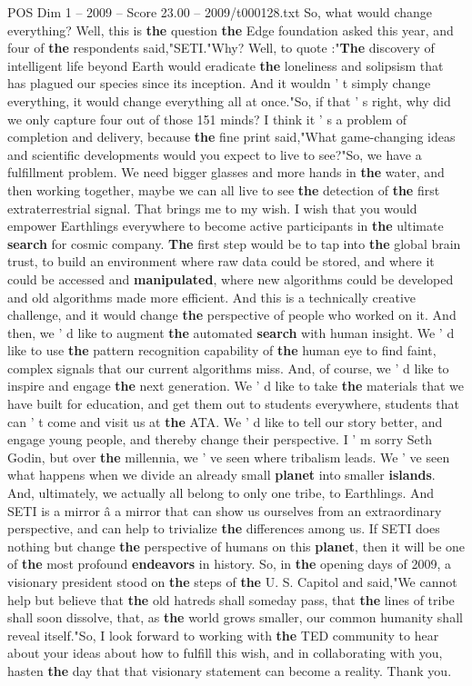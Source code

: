 \begin{textsample}{POS Dim 1 – 2009 – Score 23.00 – 2009/t000128.txt}
So, what would change everything?
Well, this is \textbf{the} question \textbf{the} Edge foundation asked this year, and four of \textbf{the} respondents said,"SETI."Why?
Well, to quote :"\textbf{The} discovery of intelligent life beyond Earth would eradicate \textbf{the} loneliness and solipsism that has plagued our species since its inception.
And it wouldn ' t simply change everything, it would change everything all at once."So, if that ' s right, why did we only capture four out of those 151 minds?
I think it ' s a problem of completion and delivery, because \textbf{the} fine print said,"What game-changing ideas and scientific developments would you expect to live to see?"So, we have a fulfillment problem.
We need bigger glasses and more hands in \textbf{the} water, and then working together, maybe we can all live to see \textbf{the} detection of \textbf{the} first extraterrestrial signal.
That brings me to my wish.
I wish that you would empower Earthlings everywhere to become active participants in \textbf{the} ultimate \textbf{search} for cosmic company. \textbf{The} first step would be to tap into \textbf{the} global brain trust, to build an environment where raw data could be stored, and where it could be accessed and \textbf{manipulated}, where new algorithms could be developed and old algorithms made more efficient.
And this is a technically creative challenge, and it would change \textbf{the} perspective of people who worked on it.
And then, we ' d like to augment \textbf{the} automated \textbf{search} with human insight.
We ' d like to use \textbf{the} pattern recognition capability of \textbf{the} human eye to find faint, complex signals that our current algorithms miss.
And, of course, we ' d like to inspire and engage \textbf{the} next generation.
We ' d like to take \textbf{the} materials that we have built for education, and get them out to students everywhere, students that can ' t come and visit us at \textbf{the} ATA.
We ' d like to tell our story better, and engage young people, and thereby change their perspective.
I ' m sorry Seth Godin, but over \textbf{the} millennia, we ' ve seen where tribalism leads.
We ' ve seen what happens when we divide an already small \textbf{planet} into smaller \textbf{islands}.
And, ultimately, we actually all belong to only one tribe, to Earthlings.
And SETI is a mirror â a mirror that can show us ourselves from an extraordinary perspective, and can help to trivialize \textbf{the} differences among us.
If SETI does nothing but change \textbf{the} perspective of humans on this \textbf{planet}, then it will be one of \textbf{the} most profound \textbf{endeavors} in history.
So, in \textbf{the} opening days of 2009, a visionary president stood on \textbf{the} steps of \textbf{the} U.
S.
Capitol and said,"We cannot help but believe that \textbf{the} old hatreds shall someday pass, that \textbf{the} lines of tribe shall soon dissolve, that, as \textbf{the} world grows smaller, our common humanity shall reveal itself."So, I look forward to working with \textbf{the} TED community to hear about your ideas about how to fulfill this wish, and in collaborating with you, hasten \textbf{the} day that that visionary statement can become a reality.
Thank you.


\end{textsample}
